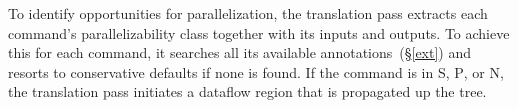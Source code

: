 \documentclass[sigplan, review, screen, anonymous]{acmart}
\newcommand{\ie}{{\em i.e.}, }
\newcommand{\cn}[1]{\mbox{\textcircled{\footnotesize #1}}}
\newcommand{\sta}{\cn{\textsc{S}}\xspace}
\newcommand{\pur}{\cn{\textsc{P}}\xspace}
\newcommand{\npu}{\cn{\textsc{N}}\xspace}
\newcommand{\sx}[1]{(\S\ref{#1})}
\newcommand{\sys}{{\scshape PaSh}\xspace}
\begin{document}
To identify opportunities for parallelization, the translation pass extracts each command's  parallelizability class together with its inputs and outputs.
To achieve this for each command, it searches all its available annotations~\sx{ext} and resorts to conservative defaults if none is found.
If the command is in \sta, \pur, or \npu, the translation pass initiates a dataflow region that is propagated up the tree.





\end{document}
